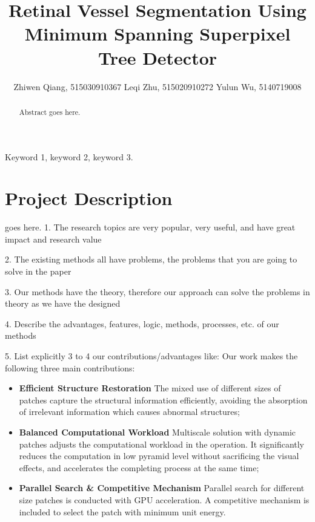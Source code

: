 \documentclass[journal]{IEEEtran}
\begin{document}
\title{Retinal Vessel Segmentation Using Minimum Spanning Superpixel Tree Detector}

\author{
Zhiwen Qiang, 515030910367 \quad Leqi Zhu, 515020910272 \quad Yulun Wu, 5140719008
}

\maketitle

\begin{abstract}
Abstract goes here.
\end{abstract}

\begin{IEEEkeywords}
Keyword 1, keyword 2, keyword 3.
\end{IEEEkeywords}

\IEEEpeerreviewmaketitle

\section{Project Description}

 goes here. 1. The research topics are very popular, very useful, and have great impact and research value

2. The existing methods all have problems, the problems that you are going to solve in the paper

3. Our methods have the theory, therefore our approach can solve the problems in theory as we have the designed

4. Describe the advantages, features, logic, methods, processes, etc. of our methods
 
5. List explicitly 3 to 4 our contributions/advantages like:
Our work makes the following three main contributions:
\begin{itemize}
\item \textbf{Efficient Structure Restoration} The mixed use of different sizes of patches capture the structural information efficiently, avoiding the absorption of irrelevant information which causes abnormal structures;
\item \textbf{Balanced Computational Workload} Multiscale solution with dynamic patches adjusts the computational workload in the operation. It significantly reduces the computation in low pyramid level without sacrificing the visual effects, and accelerates the completing process at the same time;
\item \textbf{Parallel Search \& Competitive Mechanism} Parallel search for different size patches is conducted with GPU acceleration. A competitive mechanism is included to select the patch with minimum unit energy.
\end{itemize}
\end{document}
